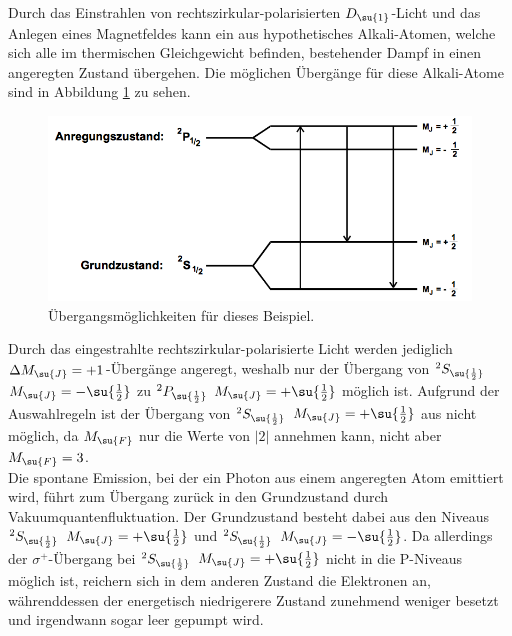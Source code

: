 Durch das Einstrahlen von rechtszirkular-polarisierten $D_{\su{1}}$-Licht und das Anlegen eines Magnetfeldes
kann ein aus hypothetisches Alkali-Atomen, welche sich alle im thermischen Gleichgewicht befinden, bestehender Dampf
in einen angeregten Zustand übergehen.
Die möglichen Übergänge für diese Alkali-Atome sind in Abbildung \ref{fig:übergängerechts} zu sehen.
\begin{figure}
    \centering
    \includegraphics[scale = 0.4]{pictures/übergängerechts.png}
    \caption{Übergangsmöglichkeiten für dieses Beispiel.\cite{1}}
    \label{fig:übergängerechts}
\end{figure}
\newline
Durch das eingestrahlte rechtszirkular-polarisierte Licht werden jediglich $\Delta M_{\su{J}} = +1$-Übergänge angeregt, weshalb
nur der Übergang von $^{2}S_{\su{\frac{1}{2}}}$ $M_{\su{J}}=-\su{\frac{1}{2}}$ zu $^{2}P_{\su{\frac{1}{2}}}$ $M_{\su{J}}=+\su{\frac{1}{2}}$
möglich ist. Aufgrund der Auswahlregeln ist der Übergang von $^{2}S_{\su{\frac{1}{2}}}$ $M_{\su{J}}=+\su{\frac{1}{2}}$ aus nicht möglich, da
$M_{\su{F}}$ nur die Werte von $|2|$ annehmen kann, nicht aber $M_{\su{F}} = 3$. \\
Die spontane Emission, bei der ein Photon aus einem angeregten Atom emittiert wird, führt zum Übergang
zurück in den Grundzustand durch Vakuumquantenfluktuation. Der Grundzustand besteht dabei aus den Niveaus $^{2}S_{\su{\frac{1}{2}}}$ $M_{\su{J}}=+\su{\frac{1}{2}}$ und
$^{2}S_{\su{\frac{1}{2}}}$ $M_{\su{J}}=-\su{\frac{1}{2}}$. Da allerdings der $\sigma^{+}$-Übergang bei $^{2}S_{\su{\frac{1}{2}}}$ $M_{\su{J}}=+\su{\frac{1}{2}}$
nicht in die P-Niveaus möglich ist, reichern sich in dem anderen Zustand die Elektronen an, währenddessen der energetisch niedrigerere Zustand zunehmend weniger besetzt und
irgendwann sogar leer gepumpt wird.

